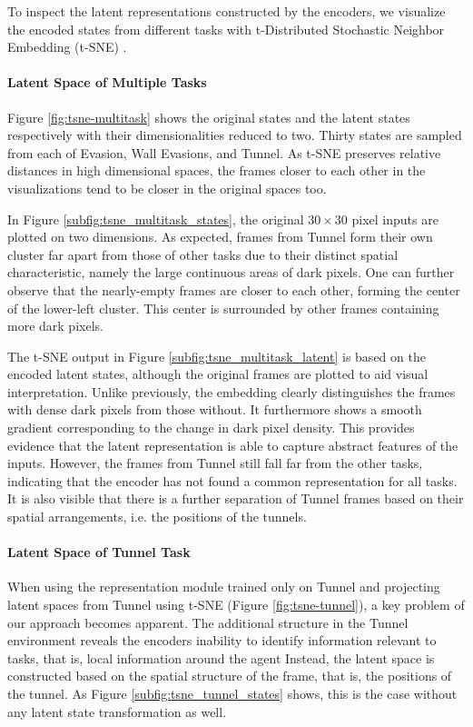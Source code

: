 To inspect the latent representations constructed by the encoders, we visualize the encoded states from different tasks with t-Distributed Stochastic Neighbor Embedding (t-SNE) \citep{tsne}. 

\paragraph{Latent Space of Multiple Tasks}
Figure \ref{fig:tsne-multitask} shows the original states and the latent states respectively with their dimensionalities reduced to two. Thirty states are sampled from each of Evasion, Wall Evasions, and Tunnel. 
As t-SNE preserves relative distances in high dimensional spaces, the frames closer to each other in the visualizations tend to be closer in the original spaces too.

In Figure \ref{subfig:tsne_multitask_states}, the original $30\times30$ pixel inputs are plotted on two dimensions.
As expected, frames from Tunnel form their own cluster far apart from those of other tasks due to their distinct spatial characteristic, namely the large continuous areas of dark pixels. One can further observe that the nearly-empty frames are closer to each other, forming the center of the lower-left cluster. This center is surrounded by other frames containing more dark pixels.

The t-SNE output in Figure \ref{subfig:tsne_multitask_latent} is based on the encoded latent states, although the original frames are plotted to aid visual interpretation.
Unlike previously, the embedding clearly distinguishes the frames with dense dark pixels from those without. It furthermore shows a smooth gradient corresponding to the change in dark pixel density.
This provides evidence that the latent representation is able to capture abstract features of the inputs.
However, the frames from Tunnel still fall far from the other tasks, indicating that the encoder has not found a common representation for all tasks.
It is also visible that there is a further separation of Tunnel frames based on their spatial arrangements, i.e. the positions of the tunnels.

\paragraph{Latent Space of Tunnel Task} \label{para:latent_tunnel}
When using the representation module trained only on Tunnel and projecting latent spaces from Tunnel using t-SNE (Figure \ref{fig:tsne-tunnel}), a key problem of our approach becomes apparent. 
The additional structure in the Tunnel environment reveals the encoders inability to identify information relevant to tasks, that is, local information around the agent 
Instead, the latent space is constructed based on the spatial structure of the frame, that is, the positions of the tunnel.
As Figure \ref{subfig:tsne_tunnel_states} shows, this is the case without any latent state transformation as well. 

